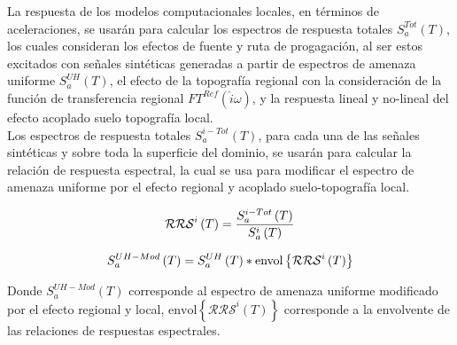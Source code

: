 \documentclass[spanish,letterpaper,12pt,twoside,openany]{article}
\begin{document}
La respuesta de los modelos computacionales locales, en términos de aceleraciones, se usarán para calcular los espectros de respuesta totales $S_{a}^{Tot} \left( T \right)$, los cuales consideran los efectos de fuente y ruta de progagación, al ser estos excitados con señales sintéticas generadas a partir de espectros de amenaza uniforme $S_{a}^{UH} \left( T \right)$, el efecto de la topografía regional con la consideración de la función de transferencia regional $FT^{Ref} \left( \hat{i} \omega \right)$, y la respuesta lineal y no-lineal del efecto acoplado suelo topografía local.\\
%
Los espectros de respuesta totales $S_{a}^{i-Tot} \left( T \right)$, para cada una de las señales sintéticas y sobre toda la superficie del dominio, se usarán para calcular la relación de respuesta espectral, la cual se usa para modificar el espectro de amenaza uniforme por el efecto regional y acoplado suelo-topografía local.
%
\begin{large}
	\begin{align}\label{eq:rrs}
		\mathcal{RRS}^{i} \left( T \right) = \dfrac{S_{a}^{i-Tot} \left( T \right)}{S_{a}^{i} \left( T \right)}
	\vspace{-1 cm}
	\end{align}
\end{large}
%
\begin{large}
	\begin{align}\label{eq:rrs}
		S_{a}^{UH-Mod} \left( T \right) = S_{a}^{UH} \left( T \right) * \text{envol} \left\lbrace \mathcal{RRS}^{i} \left( T \right) \right\rbrace
	\vspace{-1 cm}
	\end{align}
\end{large}
%
Donde $S_{a}^{UH-Mod} \left( T \right)$ corresponde al espectro de amenaza uniforme modificado por el efecto regional y local, $\text{envol} \left\lbrace \mathcal{RRS}^{i} \left( T \right) \right\rbrace$ corresponde a la envolvente de las relaciones de respuestas espectrales.
%
%
%
%
%
\end{document}

